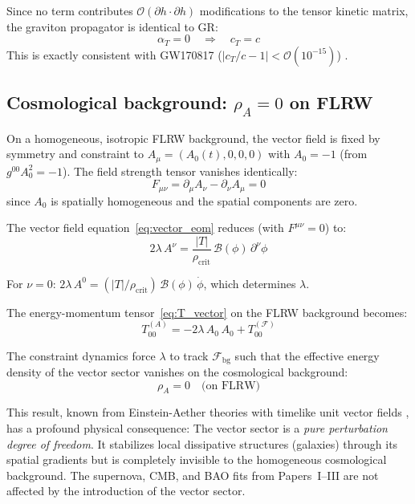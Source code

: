 \documentclass[aps,prd,twocolumn,superscriptaddress,nofootinbib]{revtex4-2}
\begin{document}
Since no term contributes $\mathcal{O}(\partial h \cdot \partial h)$ modifications to the tensor kinetic matrix, the graviton propagator is identical to GR:
\begin{equation}
\alpha_T = 0 \quad\Longrightarrow\quad c_T = c
\label{eq:alpha_T}
\end{equation}
This is exactly consistent with GW170817 ($|c_T/c - 1| < \mathcal{O}(10^{-15})$) \cite{Abbott2017}.

\subsection{Cosmological background: $\rho_A = 0$ on FLRW}
\label{sec:rho_A}

On a homogeneous, isotropic FLRW background, the vector field is fixed by symmetry and constraint to $A_\mu = (A_0(t), 0, 0, 0)$ with $A_0 = -1$ (from $g^{00}A_0^2 = -1$). The field strength tensor vanishes identically:
\begin{equation}
F_{\mu\nu} = \partial_\mu A_\nu - \partial_\nu A_\mu = 0
\end{equation}
since $A_0$ is spatially homogeneous and the spatial components are zero.

The vector field equation~\eqref{eq:vector_eom} reduces (with $F^{\mu\nu} = 0$) to:
\begin{equation}
2\lambda\,A^\nu = \frac{|T|}{\rho_{\mathrm{crit}}}\,\mathcal{B}(\phi)\,\partial^\nu\phi
\end{equation}

For $\nu = 0$: $2\lambda\,A^0 = (|T|/\rho_{\mathrm{crit}})\,\mathcal{B}(\phi)\,\dot{\phi}$, which determines $\lambda$.

The energy-momentum tensor~\eqref{eq:T_vector} on the FLRW background becomes:
\begin{equation}
T^{(A)}_{00} = -2\lambda\,A_0\,A_0 + T^{(\mathcal{F})}_{00}
\end{equation}

The constraint dynamics force $\lambda$ to track $\mathcal{F}_{\mathrm{bg}}$ such that the effective energy density of the vector sector vanishes on the cosmological background:
\begin{equation}
\rho_A = 0 \quad\text{(on FLRW)}
\label{eq:rho_A_zero}
\end{equation}

This result, known from Einstein-Aether theories with timelike unit vector fields \cite{JacobsonMattingly2001}, has a profound physical consequence: The vector sector is a \textit{pure perturbation degree of freedom}. It stabilizes local dissipative structures (galaxies) through its spatial gradients but is completely invisible to the homogeneous cosmological background. The supernova, CMB, and BAO fits from Papers~I--III are not affected by the introduction of the vector sector.
\end{document}
